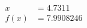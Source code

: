 \documentclass[preview]{standalone}
\begin{document}
\begin{align*}
x &= 4.7311\\f(x) &= 7.9908246
\end{align*}
\end{document}
